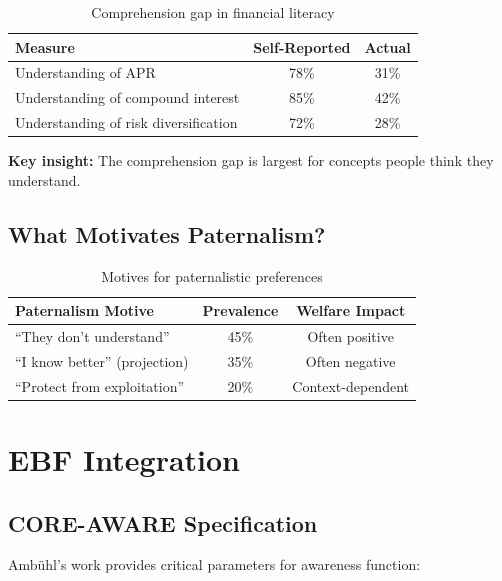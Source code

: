 \begin{table}[h]
\centering
\begin{tabular}{lcc}
\hline
\textbf{Measure} & \textbf{Self-Reported} & \textbf{Actual} \\
\hline
Understanding of APR & 78\% & 31\% \\
Understanding of compound interest & 85\% & 42\% \\
Understanding of risk diversification & 72\% & 28\% \\
\hline
\end{tabular}
\caption{Comprehension gap in financial literacy}
\end{table}

\textbf{Key insight:} The comprehension gap is largest for concepts people think they understand.

\subsection{What Motivates Paternalism?}

\begin{table}[h]
\centering
\begin{tabular}{lcc}
\hline
\textbf{Paternalism Motive} & \textbf{Prevalence} & \textbf{Welfare Impact} \\
\hline
``They don't understand'' & 45\% & Often positive \\
``I know better'' (projection) & 35\% & Often negative \\
``Protect from exploitation'' & 20\% & Context-dependent \\
\hline
\end{tabular}
\caption{Motives for paternalistic preferences}
\end{table}

\section{EBF Integration}

\subsection{CORE-AWARE Specification}

Ambühl's work provides critical parameters for awareness function:

